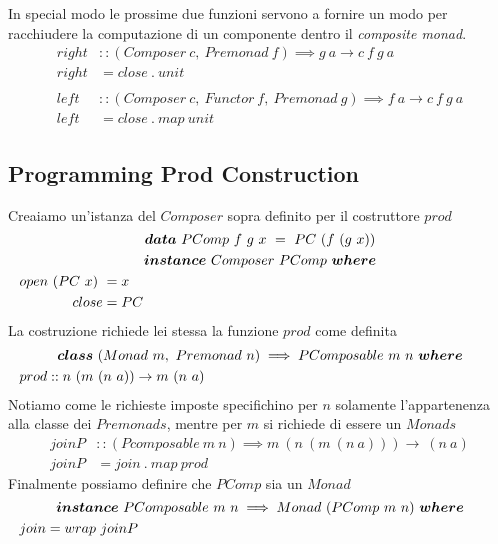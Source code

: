In special modo le prossime due funzioni servono a fornire un modo per racchiudere
la computazione di un componente dentro il \textit{composite monad}.
\label{left_and_right}
\begin{align*}
  right &:: (Composer\ c,\ Premonad\ f) \implies g\ a \to c\ f\ g\ a\\
  right &= close\ .\ unit\\\\
  left &:: (Composer\ c,\ Functor\ f,\ Premonad\ g) \implies f\ a \to c\ f\ g\ a\\
  left &= close\ .\ map\ unit
\end{align*}

\subsection{Programming Prod Construction}
\label{programming_prod_construction}
Creaiamo un'istanza del $Composer$ sopra definito per il costruttore $prod$
\begin{align*}
  \classdef{\bm{data}\ PComp\ f\ g\ x\ =\ PC\ (f\ (g\ x))}
  \classdef{\bm{instance}\ Composer\ PComp\ \bm{where} }
  open\ (PC\ x)\ &= x\\
  close &= PC
\end{align*}
La costruzione richiede lei stessa la funzione $prod$ come definita
\begin{align*}
  \classdef{\bm{class}\ (Monad\ m,\ Premonad\ n) \implies PComposable\ m\ n\ \bm{where}}
  prod &:: n\ (m\ (n\ a)) \to m\ (n\ a)
\end{align*}
Notiamo come le richieste imposte specifichino per $n$ solamente l'appartenenza
alla classe dei $Premonads$, mentre per $m$ si richiede di essere un $Monads$
\begin{align*}
  joinP &:: (Pcomposable\ m\ n) \implies m\ (n\ (m\ (n\ a))) \to \ (n\ a)\\
  joinP &= join\ .\ map\ prod
\end{align*}
Finalmente possiamo definire che $PComp$ sia un $Monad$
\begin{align*}
  \classdef{\bm{instance}\ PComposable\ m\ n \implies Monad\ (PComp\ m\ n)\ \bm{where}}
  join &= wrap\ joinP
\end{align*}

